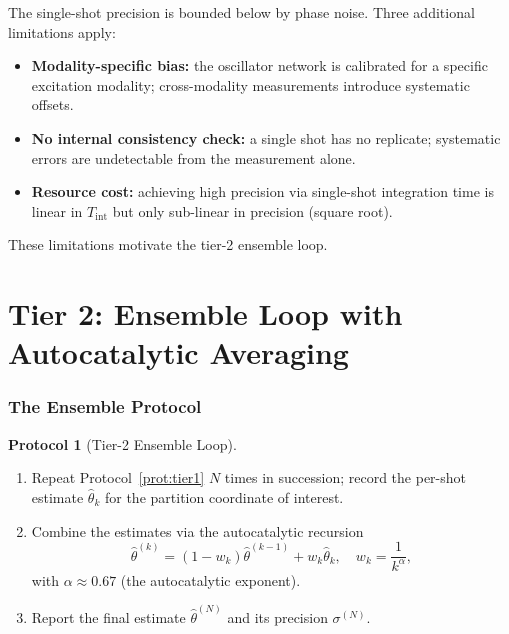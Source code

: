 \documentclass[twocolumn,11pt,a4paper]{article}
\theoremstyle{thmstyle}
\theoremstyle{axiomstyle}
\theoremstyle{definition}
\newtheorem{protocol}[theorem]{Protocol}
\theoremstyle{remark}
\begin{document}
The single-shot precision is bounded below by phase noise. Three additional limitations apply:
\begin{itemize}[nosep]
\item \textbf{Modality-specific bias:} the oscillator network is calibrated for a specific excitation modality; cross-modality measurements introduce systematic offsets.
\item \textbf{No internal consistency check:} a single shot has no replicate; systematic errors are undetectable from the measurement alone.
\item \textbf{Resource cost:} achieving high precision via single-shot integration time is linear in $T_{\mathrm{int}}$ but only sub-linear in precision (square root).
\end{itemize}

These limitations motivate the tier-2 ensemble loop.

\clearpage

\part{Tier 2: Ensemble Loop with Autocatalytic Averaging}
\label{part:tier2}

\section{The Ensemble Protocol}
\label{sec:tier2}

\begin{protocol}[Tier-2 Ensemble Loop]\label{prot:tier2}
\begin{enumerate}[label=\arabic*.,nosep]
\item Repeat Protocol~\ref{prot:tier1} $N$ times in succession; record the per-shot estimate $\hat{\theta}_{k}$ for the partition coordinate of interest.
\item Combine the estimates via the autocatalytic recursion
\begin{equation}
\hat{\theta}^{(k)}=(1-w_{k})\hat{\theta}^{(k-1)}+w_{k}\hat{\theta}_{k},\quad w_{k}=\frac{1}{k^{\alpha}},
\end{equation}
with $\alpha\approx 0.67$ (the autocatalytic exponent).
\item Report the final estimate $\hat{\theta}^{(N)}$ and its precision $\sigma^{(N)}$.
\end{enumerate}
\end{protocol}
\end{document}
